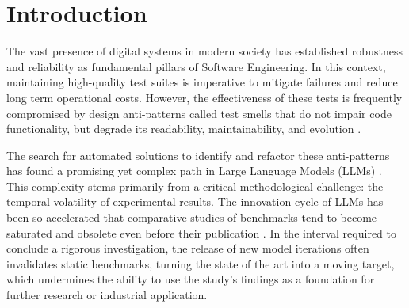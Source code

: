 \documentclass[sigconf]{acmart}
\begin{document}
\frenchspacing
\maketitle

\section{Introduction}
The vast presence of digital systems in modern society has established robustness and reliability as fundamental pillars of Software Engineering. In this context, maintaining high-quality test suites is imperative to mitigate failures and reduce long term operational costs. However, the effectiveness of these tests is frequently compromised by design anti-patterns called test smells that do not impair code functionality, but degrade its readability, maintainability, and evolution \cite{Virginio2019}.


The search for automated solutions to identify and refactor these anti-patterns has found a promising yet complex path in Large Language Models (LLMs) \cite{alves2025quality,lucas2024evaluating,wu2024ismell}. This complexity stems primarily from a critical methodological challenge: the temporal volatility of experimental results. The innovation cycle of LLMs has been so accelerated that comparative studies of benchmarks tend to become saturated and obsolete even before their publication \cite{allen2026well,ott2022mapping}. In the interval required to conclude a rigorous investigation, the release of new model iterations often invalidates static benchmarks, turning the state of the art into a moving target, which undermines the ability to use the study's findings as a foundation for further research or industrial application.
\end{document}
